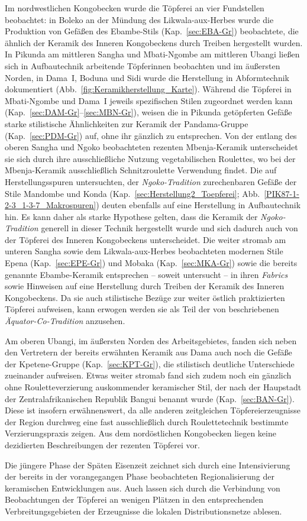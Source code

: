 Im nordwestlichen Kongobecken wurde die Töpferei an vier Fundstellen beobachtet: in Boleko an der Mündung des Likwala-aux-Herbes wurde die Produktion von Gefäßen des Ebambe-Stils (Kap.~\ref{sec:EBA-Gr}) beobachtete, die ähnlich der Keramik des Inneren Kongobeckens durch Treiben hergestellt wurden. In Pikunda am mittleren Sangha und Mbati-Ngombe am mittleren Ubangi ließen sich in Aufbautechnik arbeitende Töpferinnen beobachten und im äußersten Norden, in Dama~I, Boduna und Sidi wurde die Herstellung in Abformtechnik dokumentiert (Abb.~\ref{fig:Keramikherstellung_Karte}). Während die Töpferei in Mbati-Ngombe und Dama~I jeweils spezifischen Stilen zugeordnet werden kann (Kap.~\ref{sec:DAM-Gr}--\ref{sec:MBN-Gr}), weisen die in Pikunda getöpferten Gefäße starke stilistische Ähnlichkeiten zur Keramik der Pandama-Gruppe (Kap.~\ref{sec:PDM-Gr}) auf, ohne ihr gänzlich zu entsprechen. Von der entlang des oberen Sangha und Ngoko beobachteten rezenten Mbenja-Keramik unterscheidet sie sich durch ihre ausschließliche Nutzung vegetabilischen Roulettes, wo bei der Mbenja-Keramik ausschließlich Schnitzroulette Verwendung findet. Die auf Herstellungsspuren untersuchten, der \textit{Ngoko-Tradition} zurechenbaren Gefäße der Stile Mandombe und Konda (Kap.~\ref{sec:Herstellung2_Toepferei}; Abb.~\ref{PIK87-1-2-3_1-3-7_Makrospuren}) deuten ebenfalls auf eine Herstellung in Aufbautechnik hin. Es kann daher als starke Hypothese gelten, dass die Keramik der \textit{Ngoko-Tradition} generell in dieser Technik hergestellt wurde und sich dadurch auch von der Töpferei des Inneren Kongobeckens unterscheidet. Die weiter stromab am unteren Sangha sowie dem Likwala-aux-Herbes beobachteten modernen Stile Epena (Kap.~\ref{sec:EPE-Gr}) und Mobaka (Kap.~\ref{sec:MKA-Gr}) sowie die bereits genannte Ebambe-Keramik entsprechen -- soweit untersucht -- in ihren \textit{Fabrics} sowie Hinweisen auf eine Herstellung durch Treiben der Keramik des Inneren Kongobeckens. Da sie auch stilistische Bezüge zur weiter östlich praktizierten Töpferei aufweisen, kann erwogen werden sie als Teil der von \textcite[222 Abb.~4, 224, 273]{Wotzka.1995} beschriebenen \textit{Äquator-Co-Tradition} anzusehen.

Am oberen Ubangi, im äußersten Norden des Arbeitsgebietes, fanden sich neben den Vertretern der bereits erwähnten Keramik aus Dama auch noch die Gefäße der Kpetene-Gruppe (Kap.~\ref{sec:KPT-Gr}), die stilistisch deutliche Unterschiede zueinander aufweisen. Etwas weiter stromab fand sich zudem noch ein gänzlich ohne Rouletteverzierung auskommender keramischer Stil, der nach der Haupstadt der Zentralafrikanischen Republik Bangui benannt wurde (Kap.~\ref{sec:BAN-Gr}). Diese ist insofern erwähnenswert, da alle anderen zeitgleichen Töpfereierzeugnisse der Region durchweg eine fast ausschließlich durch Roulettetechnik bestimmte Verzierungspraxis zeigen. Aus dem nordöstlichen Kongobecken liegen keine dezidierten Beschreibungen der rezenten Töpferei vor.

Die jüngere Phase der Späten Eisenzeit zeichnet sich durch eine Intensivierung der bereits in der vorangegangen Phase beobachteten Regionalisierung der keramischen Entwicklungen aus. Auch lassen sich durch die Verbindung von Beobachtungen der Töpferei an wenigen Plätzen in den entsprechenden Verbreitungsgebieten der Erzeugnisse die lokalen Distributionsnetze ablesen.